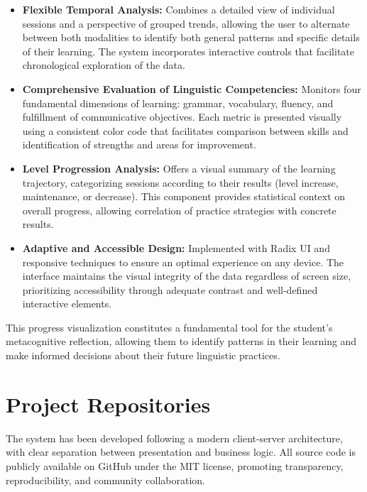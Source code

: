 \begin{itemize}
    \item \textbf{Flexible Temporal Analysis:} Combines a detailed view of individual sessions and a perspective of grouped trends, allowing the user to alternate between both modalities to identify both general patterns and specific details of their learning. The system incorporates interactive controls that facilitate chronological exploration of the data.
    
    \item \textbf{Comprehensive Evaluation of Linguistic Competencies:} Monitors four fundamental dimensions of learning: grammar, vocabulary, fluency, and fulfillment of communicative objectives. Each metric is presented visually using a consistent color code that facilitates comparison between skills and identification of strengths and areas for improvement.
    
    \item \textbf{Level Progression Analysis:} Offers a visual summary of the learning trajectory, categorizing sessions according to their results (level increase, maintenance, or decrease). This component provides statistical context on overall progress, allowing correlation of practice strategies with concrete results.
    
    \item \textbf{Adaptive and Accessible Design:} Implemented with Radix UI and responsive techniques to ensure an optimal experience on any device. The interface maintains the visual integrity of the data regardless of screen size, prioritizing accessibility through adequate contrast and well-defined interactive elements.
\end{itemize}

This progress visualization constitutes a fundamental tool for the student's metacognitive reflection, allowing them to identify patterns in their learning and make informed decisions about their future linguistic practices.

\section{Project Repositories}
\label{sec:repositorios-proyecto}

The system has been developed following a modern client-server architecture, with clear separation between presentation and business logic. All source code is publicly available on GitHub under the MIT license, promoting transparency, reproducibility, and community collaboration.

